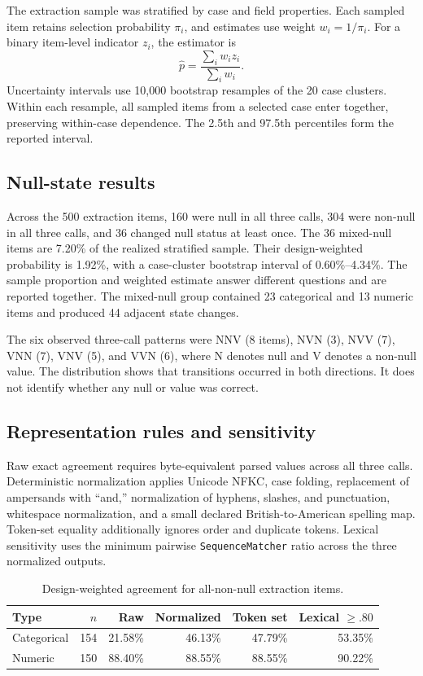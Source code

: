 \documentclass[acmsmall,anonymous,review]{acmart}
\begin{document}
The extraction sample was stratified by case and field properties. Each sampled item retains selection probability $\pi_i$, and estimates use weight $w_i=1/\pi_i$. For a binary item-level indicator $z_i$, the estimator is
\[
\widehat{p}=\frac{\sum_i w_i z_i}{\sum_i w_i}.
\]
Uncertainty intervals use 10,000 bootstrap resamples of the 20 case clusters. Within each resample, all sampled items from a selected case enter together, preserving within-case dependence. The 2.5th and 97.5th percentiles form the reported interval.

\subsection{Null-state results}

Across the 500 extraction items, 160 were null in all three calls, 304 were non-null in all three calls, and 36 changed null status at least once. The 36 mixed-null items are 7.20\% of the realized stratified sample. Their design-weighted probability is 1.92\%, with a case-cluster bootstrap interval of 0.60\%--4.34\%. The sample proportion and weighted estimate answer different questions and are reported together. The mixed-null group contained 23 categorical and 13 numeric items and produced 44 adjacent state changes.

The six observed three-call patterns were NNV (8 items), NVN (3), NVV (7), VNN (7), VNV (5), and VVN (6), where N denotes null and V denotes a non-null value. The distribution shows that transitions occurred in both directions. It does not identify whether any null or value was correct.

\subsection{Representation rules and sensitivity}

Raw exact agreement requires byte-equivalent parsed values across all three calls. Deterministic normalization applies Unicode NFKC, case folding, replacement of ampersands with ``and,'' normalization of hyphens, slashes, and punctuation, whitespace normalization, and a small declared British-to-American spelling map. Token-set equality additionally ignores order and duplicate tokens. Lexical sensitivity uses the minimum pairwise \texttt{SequenceMatcher} ratio across the three normalized outputs.

\begin{table}[h]
\caption{Design-weighted agreement for all-non-null extraction items.}
\label{tab:repeatability-supp}
\small
\begin{tabular}{lrrrrr}
\toprule
\textbf{Type} & \textbf{$n$} & \textbf{Raw} & \textbf{Normalized} & \textbf{Token set} & \textbf{Lexical $\geq .80$} \\
\midrule
Categorical & 154 & 21.58\% & 46.13\% & 47.79\% & 53.35\% \\
Numeric & 150 & 88.40\% & 88.55\% & 88.55\% & 90.22\% \\
\bottomrule
\end{tabular}
\end{table}
\end{document}
